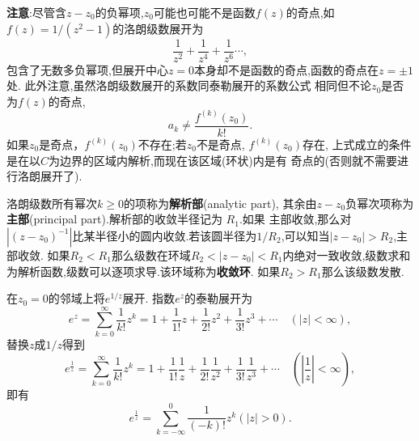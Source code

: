 \textbf{注意}:尽管含$z-z_0$的负幂项,$z_0$可能也可能不是函数$f(z)$的奇点,如$f(z) = 1/(z^2-1)$的洛朗级数展开为
$$
\frac{1}{z^2} + \frac{1}{z^4} + \frac{1}{z^6}\cdots,
$$
包含了无数多负幂项,但展开中心$z=0$本身却不是函数的奇点,函数的奇点在$z=\pm 1$处. 此外注意,虽然洛朗级数展开的系数同泰勒展开的系数公式
相同但不论$z_0$是否为$f(z)$的奇点,
$$a_k \neq \frac{f^{(k)}(z_0)}{k!}.
$$
如果$z_0$是奇点，$f^{(k)}(z_0)$不存在;若$z_0$不是奇点, $f^{(k)}(z_0)$存在, 上式成立的条件是在以$C$为边界的区域内解析,而现在该区域(环状)内是有
奇点的(否则就不需要进行洛朗展开了).

洛朗级数所有幂次$k\geq 0$的项称为\textbf{解析部}(analytic part), 其余由$z-z_0$负幂次项称为\textbf{主部}(principal part).解析部的收敛半径记为
$R_1$.如果
主部收敛,那么对$|(z-z_0)^{-1}|$比某半径小的圆内收敛.若该圆半径为$1/R_2$,可以知当$|z-z_0|> R_2$,主部收敛.
如果$R_2 < R_1$那么级数在环域$R_2 < |z- z_0| < R_1$内绝对一致收敛,级数求和为解析函数,级数可以逐项求导.该环域称为\textbf{收敛环}.
如果$R_2 > R_1$那么该级数发散.

\begin{examplebox}{在$z_0 = 0$的邻域上将$e^{1/z}$展开.}
指数$e^z$的泰勒展开为
\[
    e^z=\sum_{k=0}^{\infty} \frac{1}{k !} z^k=1+\frac{1}{1 !} z+\frac{1}{2 !} z^2+\frac{1}{3 !} z^3+\cdots \quad(|z|<\infty),    
\]
替换$z$成$1/z$得到
\[
    e^{\frac{1}{z}}=\sum_{k=0}^{\infty} \frac{1}{k !} z^k=1+\frac{1}{1 !} \frac{1}{z}+\frac{1}{2 !} \frac{1}{z^2}+\frac{1}{3 !} \frac{1}{z^3}+\cdots \quad(|\frac{1}{z}|<\infty),    
\]
即有
\[
e^{\frac{1}{z}} = \sum_{k=-\infty}^{0} \frac{1}{(-k)!} z^k ( |z| > 0) .
\]
\end{examplebox}